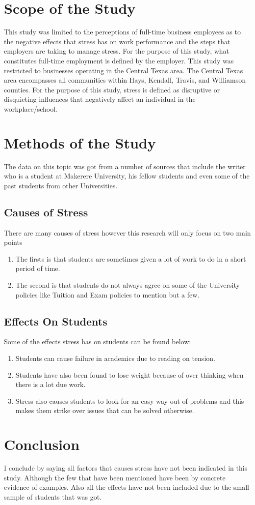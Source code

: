 \documentclass{article}
\begin{document}
\section{Scope of the Study}
This study was limited to the perceptions of full-time business employees as to the
negative effects that stress has on work performance and the steps that employers are
taking to manage stress. For the purpose of this study, what constitutes full-time
employment is defined by the employer. This study was restricted to businesses
operating in the Central Texas area. The Central Texas area encompasses all
communities within Hays, Kendall, Travis, and Williamson counties. For the purpose
of this study, stress is defined as disruptive or disquieting influences that negatively
affect an individual in the workplace/school. 

\section {Methods of the Study}
The data on this topic was got from a number of sources that include the writer who is a student at Makerere University, his fellow students and even some of the past students from other Universities.

\subsection{Causes of Stress}
There are many causes of stress however this research will only focus on two main points
\begin{enumerate}
\item The firsts is that students are sometimes given a lot of work to do in a short period of time.
\item The second is that students do not always agree on some of the University policies like Tuition and Exam policies to mention but a few.
\end{enumerate}

\subsection{Effects On Students}
Some of the effects stress has on students can be found below:
\begin{enumerate}
\item Students can cause failure in academics due to reading on tension.
\item Students have also been found to lose weight because of over thinking when there is a lot due work.
\item Stress also causes students to look for an easy way out of problems and this makes them strike over issues that can be solved otherwise.
\end{enumerate}

\section{Conclusion}
I conclude by saying all factors that causes stress have not been indicated in this study. Although the few that have been mentioned have been by concrete evidence of examples.
Also all the effects have not been included due to the small sample of students that was got.
\end{document}
